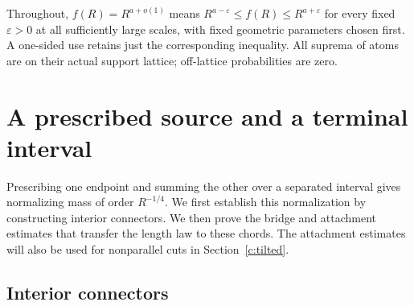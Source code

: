 \documentclass[11pt]{article}
\numberwithin{equation}{section}
\theoremstyle{definition}\newtheorem{definition}[theorem]{Definition}
\theoremstyle{remark}\newtheorem{remark}[theorem]{Remark}
\begin{document}
Throughout, $f(R)=R^{a+o(1)}$ means
$R^{a-\varepsilon}\le f(R)\le R^{a+\varepsilon}$ for every fixed
$\varepsilon>0$ at all sufficiently large scales, with fixed geometric
parameters chosen first. A one-sided use retains just the corresponding
inequality. All suprema of atoms are on their actual support lattice;
off-lattice probabilities are zero.

\section{A prescribed source and a terminal interval}\label{c:window}
Prescribing one endpoint and summing the other over a separated interval
gives normalizing mass of order $R^{-1/4}$. We first establish this
normalization by constructing interior connectors. We then prove the
bridge and attachment estimates that transfer the length law to these
chords. The attachment estimates will also be used for nonparallel cuts
in Section~\ref{c:tilted}.

\subsection{Interior connectors}
\end{document}
